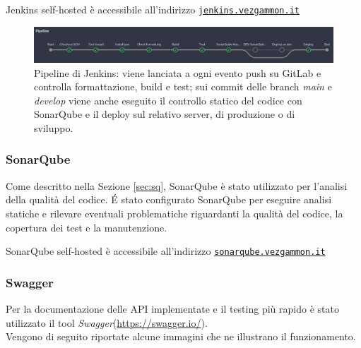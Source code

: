 \documentclass{article}
\begin{document}
Jenkins self-hosted è accessibile all'indirizzo \href{https://jenkins.vezgammon.it}{\texttt{jenkins.vezgammon.it}}

\begin{figure}[H]
    \centering
    \includegraphics[width=1\textwidth]{report-jk_pipeline}
    \caption{Pipeline di Jenkins: viene lanciata a ogni evento push su GitLab e controlla formattazione, build e test; sui 
    commit delle branch \textit{main} e \textit{develop} viene anche eseguito il controllo statico del codice con SonarQube 
    e il deploy sul relativo server, di produzione o di sviluppo.}
    \label{fig:jk_pipeline}
\end{figure}

\subsubsection{SonarQube}
Come descritto nella Sezione \ref{sec:sq}, SonarQube è stato utilizzato per l'analisi della qualità del codice. \'E stato 
configurato SonarQube per eseguire analisi statiche e rilevare eventuali problematiche riguardanti la qualità del codice, 
la copertura dei test e la manutenzione.

SonarQube self-hosted è accessibile all'indirizzo \href{https://sonarqube.vezgammon.it}{\texttt{sonarqube.vezgammon.it}}

\subsubsection{Swagger} \label{sec:swagger}

Per la documentazione delle API implementate e il testing più rapido è stato utilizzato il tool 
\textit{Swagger}(\url{https://swagger.io/}). \\
Vengono di seguito riportate alcune immagini che ne illustrano il funzionamento.
\end{document}
